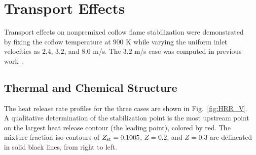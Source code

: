 \documentclass[review,3p,times]{elsarticle}
\begin{document}

\section{Transport Effects}

Transport effects on nonpremixed coflow flame stabilization were demonstrated by fixing the coflow temperature at $900$ K while varying the uniform inlet velocities as $2.4$, $3.2$, and $8.0$ m/s.  The $3.2$ m/s case was computed in previous work~\cite{deng15}.  

\begin{table}
  \caption{Computational domain and number of grid points.}
  \label{table:domain_V}
  \centering
  \normalsize
\end{table}

\subsection{Thermal and Chemical Structure}  
The heat release rate profiles for the three cases are shown in Fig.~\ref{fig:HRR_V}.  A qualitative determination of the stabilization point is the most upstream point on the largest heat release contour (the leading point), colored by red.  The mixture fraction iso-contours of $Z_{\rm st} = 0.1005$, $Z = 0.2$, and $Z = 0.3$ are delineated in solid black lines, from right to left.
\end{document}
